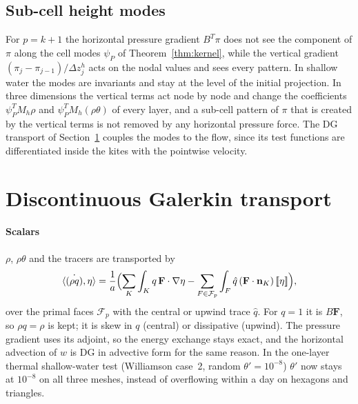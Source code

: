 \documentclass[preprint,12pt]{elsarticle}
\newcommand{\bF}{\mathbf{F}}
\newcommand{\bn}{\mathbf{n}}
\newcommand{\Fc}{\mathcal{F}}
\newcommand{\jump}[1]{[\![#1]\!]}
\theoremstyle{definition}
\begin{document}
\subsection{Sub-cell height modes}\label{sec:submodes}
For $p = k+1$ the horizontal pressure gradient $B^T\pi$ does not see the component of $\pi$ along the cell
modes $\psi_P$ of Theorem~\ref{thm:kernel}, while the vertical gradient $(\pi_j - \pi_{j-1})/\Delta z^h_j$ acts
on the nodal values and sees every pattern. In shallow water the modes are invariants and stay at the level
of the initial projection. In three dimensions the vertical terms act node by node and change the
coefficients $\psi_P^TM_h\rho$ and $\psi_P^TM_h(\rho\theta)$ of every layer, and a sub-cell pattern of $\pi$
that is created by the vertical terms is not removed by any horizontal pressure force. The DG transport of
Section~\ref{sec:dg} couples the modes to the flow, since its test functions are differentiated inside the
kites with the pointwise velocity.

\section{Discontinuous Galerkin transport}\label{sec:dg}

\paragraph{Scalars} $\rho$, $\rho\theta$ and the tracers are transported by
\begin{equation}\label{eq:dg-theta}
  \langle \dot{(\rho q)}, \eta\rangle = \frac1a\Bigl(\sum_K \int_K q\,\bF\cdot\nabla\eta
     - \sum_{F\in\Fc_p} \int_F \hat q\,(\bF\cdot\bn_K)\,\jump{\eta}\Bigr),
\end{equation}
over the primal faces $\Fc_p$ with the central or upwind trace $\hat q$. For $q = 1$ it is $B\bF$, so
$\rho q = \rho$ is kept; it is skew in $q$ (central) or dissipative (upwind). The pressure gradient uses its
adjoint, so the energy exchange stays exact, and the horizontal advection of $w$ is DG in advective form for
the same reason. In the one-layer thermal shallow-water test (Williamson case~2, random
$\theta' = 10^{-8}$) $\theta'$ now stays at $10^{-8}$ on all three meshes, instead of overflowing within a
day on hexagons and triangles.
\end{document}
